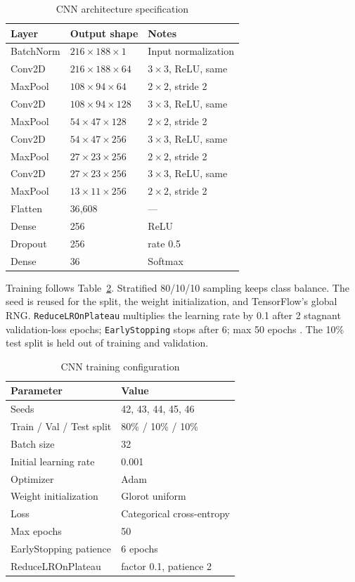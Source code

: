 \documentclass[pdflatex,sn-mathphys-num,iicol]{sn-jnl}
\begin{document}
\begin{table}[t]
\caption{CNN architecture specification}\label{tab_cnn_arch}
\begin{tabularx}{\columnwidth}{@{}lXl@{}}
\toprule
Layer & Output shape & Notes \\
\midrule
BatchNorm & $216{\times}188{\times}1$ & Input normalization \\
Conv2D & $216{\times}188{\times}64$ & $3{\times}3$, ReLU, same \\
MaxPool & $108{\times}94{\times}64$ & $2{\times}2$, stride 2 \\
Conv2D & $108{\times}94{\times}128$ & $3{\times}3$, ReLU, same \\
MaxPool & $54{\times}47{\times}128$ & $2{\times}2$, stride 2 \\
Conv2D & $54{\times}47{\times}256$ & $3{\times}3$, ReLU, same \\
MaxPool & $27{\times}23{\times}256$ & $2{\times}2$, stride 2 \\
Conv2D & $27{\times}23{\times}256$ & $3{\times}3$, ReLU, same \\
MaxPool & $13{\times}11{\times}256$ & $2{\times}2$, stride 2 \\
Flatten & 36{,}608 & --- \\
Dense & 256 & ReLU \\
Dropout & 256 & rate 0.5 \\
Dense & 36 & Softmax \\
\bottomrule
\end{tabularx}
\end{table}

Training follows Table~\ref{tab_cnn_train}. Stratified 80/10/10 sampling keeps class balance. The seed is reused for the split, the weight initialization, and TensorFlow's global RNG. \texttt{ReduceLROnPlateau} multiplies the learning rate by 0.1 after 2 stagnant validation-loss epochs; \texttt{EarlyStopping} stops after 6; max 50 epochs \cite{Wolf-Monheim2025}. The 10\% test split is held out of training and validation.

\begin{table}[t]
\caption{CNN training configuration}\label{tab_cnn_train}
\begin{tabular}{@{}ll@{}}
\toprule
Parameter & Value \\
\midrule
Seeds & 42, 43, 44, 45, 46 \\
Train / Val / Test split & 80\% / 10\% / 10\% \\
Batch size & 32 \\
Initial learning rate & 0.001 \\
Optimizer & Adam \\
Weight initialization & Glorot uniform \\
Loss & Categorical cross-entropy \\
Max epochs & 50 \\
EarlyStopping patience & 6 epochs \\
ReduceLROnPlateau & factor 0.1, patience 2 \\
\bottomrule
\end{tabular}
\end{table}
\end{document}
